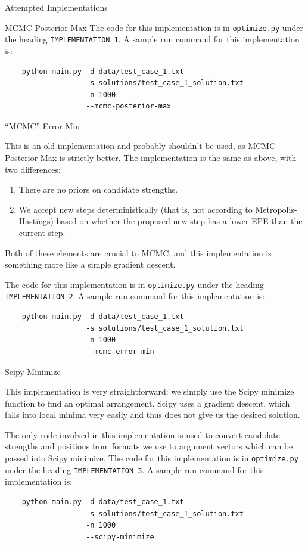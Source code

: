 \documentclass{article}
\begin{document}
\begin{section}{Attempted Implementations}
\begin{subsection}{MCMC Posterior Max}
The code for this implementation is in \texttt{optimize.py} under the heading \texttt{IMPLEMENTATION 1}. A sample run command for this implementation is:
\begin{verbatim}
    python main.py -d data/test_case_1.txt
                   -s solutions/test_case_1_solution.txt
                   -n 1000
                   --mcmc-posterior-max
\end{verbatim}


\end{subsection}

\begin{subsection}{``MCMC'' Error Min}

This is an old implementation and probably shouldn't be used, as MCMC Posterior Max is strictly better. The implementation is the same as above, with two differences:
\begin{enumerate}
\item There are no priors on candidate strengths.
\item We accept new steps deterministically (that is, not according to Metropolis-Hastings) based on whether the proposed new step has a lower EPE than the current step.
\end{enumerate}
Both of these elements are crucial to MCMC, and this implementation is something more like a simple gradient descent.

The code for this implementation is in \texttt{optimize.py} under the heading \texttt{IMPLEMENTATION 2}. A sample run command for this implementation is:
\begin{verbatim}
    python main.py -d data/test_case_1.txt
                   -s solutions/test_case_1_solution.txt
                   -n 1000
                   --mcmc-error-min
\end{verbatim}

\end{subsection}



\begin{subsection}{Scipy Minimize}

This implementation is very straightforward: we simply use the Scipy minimize function to find an optimal arrangement. Scipy uses a gradient descent, which falls into local minima very easily and thus does not give us the desired solution.

The only code involved in this implementation is used to convert candidate strengths and positions from formats we use to argument vectors which can be passed into Scipy minimize. The code for this implementation is in \texttt{optimize.py} under the heading \texttt{IMPLEMENTATION 3}. A sample run command for this implementation is:
\begin{verbatim}
    python main.py -d data/test_case_1.txt
                   -s solutions/test_case_1_solution.txt
                   -n 1000
                   --scipy-minimize
\end{verbatim}


\end{subsection}
\end{section}
\end{document}
